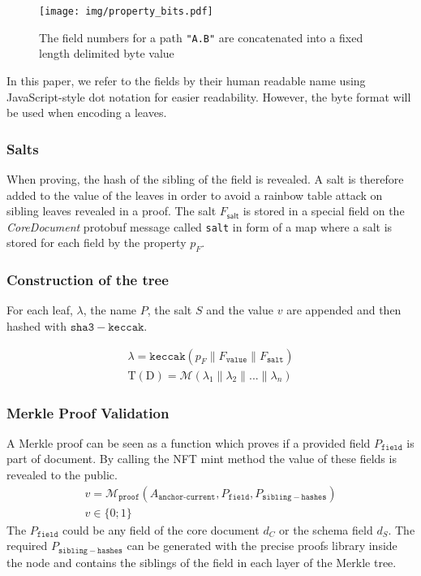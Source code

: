 \begin{figure}[ht]
  \centering
  \texttt{[image: img/property\_bits.pdf]}
  \caption{The field numbers for a path \texttt{"A.B"} are concatenated into a fixed length delimited byte value} 
  \label{img:property_bits}
\end{figure}

In this paper, we refer to the fields by their human readable name using JavaScript-style dot notation for easier readability. However, the byte format will be used when encoding a leaves.


\subsubsection{Salts}
When proving, the hash of the sibling of the field is revealed. A salt is therefore added to the value of the leaves in order to avoid a rainbow table attack on sibling leaves revealed in a proof. The salt $F_{\mathsf{salt}}$ is stored in a special field on the \textit{CoreDocument} protobuf message called \texttt{salt} in form of a map where a salt is stored for each field by the property $p_F$.

\subsubsection{Construction of the tree}
For each leaf, $\lambda$, the name $P$, the salt $S$ and the value $v$ are appended and then hashed with $\mathtt{sha3-keccak}$.

\begin{eqnarray}
\lambda = \mathtt{keccak}(p_{F} \parallel F_{\texttt{value}} \parallel	 F_{\texttt{salt}})\\
\mathrm{T}(\mathrm{D}) = \mathcal{M}({\lambda_{1} \parallel \lambda_{2} \parallel ... \parallel \lambda_{n}})
\end{eqnarray}

\subsubsection{Merkle Proof Validation}\label{sec:merkle_proof_validation}
A Merkle proof can be seen as a function which proves if a provided field $P_\mathtt{field}$ is part of document. By calling the NFT mint method the value of these fields is revealed to the public. 
\begin{equation}
\begin{split}
v = \mathcal{M}_{\texttt{proof}}(A_{\texttt{anchor-current}},P_\mathtt{field},P_\mathtt{sibling-hashes}) \\
v \in \{0;1\}
\end{split}
\end{equation}
The $P_\mathtt{field}$  could be any field of the core document $d_C$ or the schema field $d_S$. The required $P_\mathtt{sibling-hashes}$ can be generated with the precise proofs library inside the node and contains the siblings of the field in each layer of the Merkle tree.  